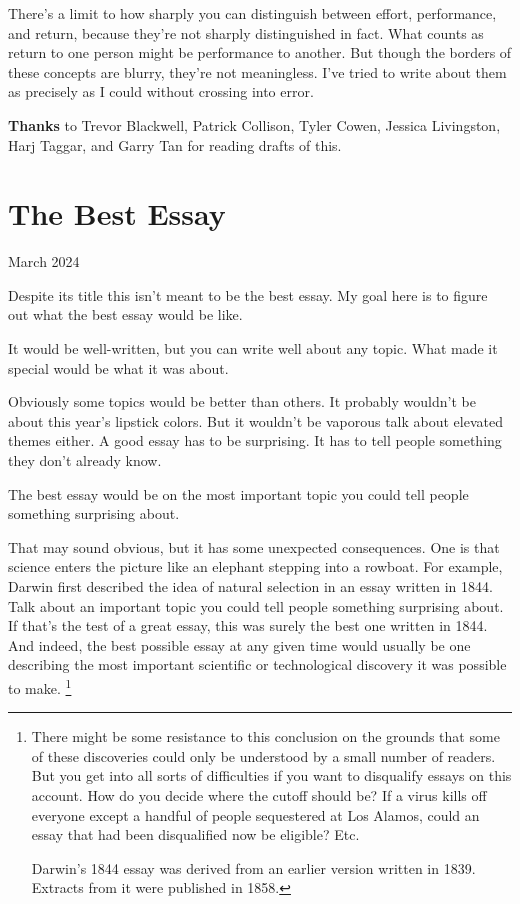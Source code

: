 \documentclass[12pt]{book}
\begin{document}
There's a limit to how sharply you can distinguish between effort,
performance, and return, because they're not sharply distinguished in
fact. What counts as return to one person might be performance to
another. But though the borders of these concepts are blurry, they're
not meaningless. I've tried to write about them as precisely as I could
without crossing into error.

\textbf{Thanks} to Trevor Blackwell, Patrick Collison, Tyler Cowen,
Jessica Livingston, Harj Taggar, and Garry Tan for reading drafts of
this.
\chapter{The Best Essay}

March 2024

Despite its title this isn't meant to be the best essay. My goal here is
to figure out what the best essay would be like.

It would be well-written, but you can write well about any topic. What
made it special would be what it was about.

Obviously some topics would be better than others. It probably wouldn't
be about this year's lipstick colors. But it wouldn't be vaporous talk
about elevated themes either. A good essay has to be surprising. It has
to tell people something they don't already know.

The best essay would be on the most important topic you could tell
people something surprising about.

That may sound obvious, but it has some unexpected consequences. One is
that science enters the picture like an elephant stepping into a
rowboat. For example, Darwin first described the idea of natural
selection in an essay written in 1844. Talk about an important topic you
could tell people something surprising about. If that's the test of a
great essay, this was surely the best one written in 1844. And indeed,
the best possible essay at any given time would usually be one
describing the most important scientific or technological discovery it
was possible to make. \footnote{There might be some resistance to this conclusion on the grounds
that some of these discoveries could only be understood by a small
number of readers. But you get into all sorts of difficulties if you
want to disqualify essays on this account. How do you decide where the
cutoff should be? If a virus kills off everyone except a handful of
people sequestered at Los Alamos, could an essay that had been
disqualified now be eligible? Etc.

Darwin's 1844 essay was derived from an earlier version written in 1839.
Extracts from it were published in 1858.}
\end{document}
